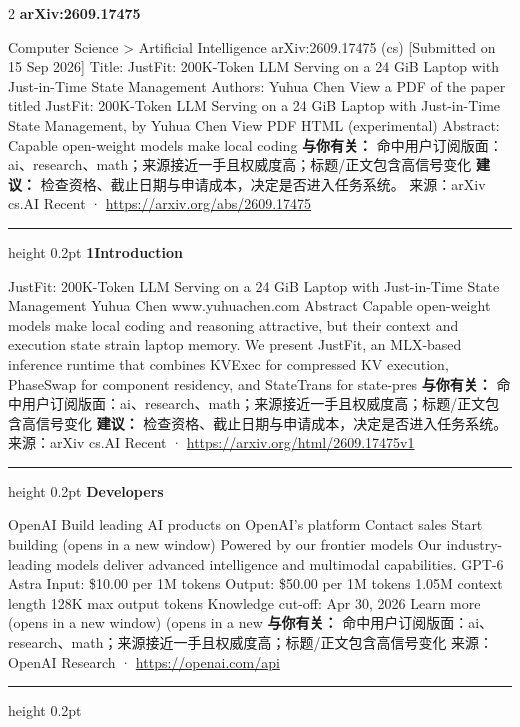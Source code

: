 \documentclass[10.5pt]{ctexart}
\begin{document}
\begin{multicols}{2}
{\large\bfseries arXiv:2609.17475}\par
Computer Science > Artificial Intelligence arXiv:2609.17475 (cs) [Submitted on 15 Sep 2026] Title: JustFit: 200K-Token LLM Serving on a 24 GiB Laptop with Just-in-Time State Management Authors: Yuhua Chen View a PDF of the paper titled JustFit: 200K-Token LLM Serving on a 24 GiB Laptop with Just-in-Time State Management, by Yuhua Chen View PDF HTML (experimental) Abstract: Capable open-weight models make local coding
\textbf{与你有关：} 命中用户订阅版面：ai、research、math；来源接近一手且权威度高；标题/正文包含高信号变化
\textbf{建议：} 检查资格、截止日期与申请成本，决定是否进入任务系统。
{\footnotesize\color{ormuted} 来源：arXiv cs.AI Recent · \url{https://arxiv.org/abs/2609.17475}}
\vspace{2mm}
\hrule height 0.2pt
\vspace{2mm}
{\large\bfseries 1Introduction}\par
JustFit: 200K-Token LLM Serving on a 24 GiB Laptop with Just-in-Time State Management Yuhua Chen www.yuhuachen.com Abstract Capable open-weight models make local coding and reasoning attractive, but their context and execution state strain laptop memory. We present JustFit, an MLX-based inference runtime that combines KVExec for compressed KV execution, PhaseSwap for component residency, and StateTrans for state-pres
\textbf{与你有关：} 命中用户订阅版面：ai、research、math；来源接近一手且权威度高；标题/正文包含高信号变化
\textbf{建议：} 检查资格、截止日期与申请成本，决定是否进入任务系统。
{\footnotesize\color{ormuted} 来源：arXiv cs.AI Recent · \url{https://arxiv.org/html/2609.17475v1}}
\vspace{2mm}
\hrule height 0.2pt
\vspace{2mm}
{\large\bfseries Developers}\par
OpenAI Build leading AI products on OpenAI’s platform Contact sales Start building (opens in a new window) Powered by our frontier models Our industry-leading models deliver advanced intelligence and multimodal capabilities. GPT-6 Astra Input: \$10.00 per 1M tokens Output: \$50.00 per 1M tokens 1.05M context length 128K max output tokens Knowledge cut-off: Apr 30, 2026 Learn more (opens in a new window) (opens in a new
\textbf{与你有关：} 命中用户订阅版面：ai、research、math；来源接近一手且权威度高；标题/正文包含高信号变化
{\footnotesize\color{ormuted} 来源：OpenAI Research · \url{https://openai.com/api}}
\vspace{2mm}
\hrule height 0.2pt

\end{multicols}
\end{document}
